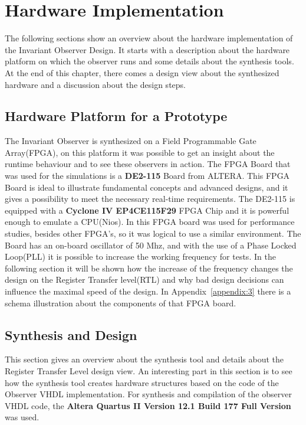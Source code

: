 \chapter{Hardware Implementation}

\ifpdf
    \graphicspath{{Chapter3/Figs/Raster/}{Chapter3/Figs/PDF/}{Chapter3/Figs/}}
\else
    \graphicspath{{Chapter3/Figs/Vector/}{Chapter3/Figs/}}
\fi


The following sections show an overview about the hardware implementation of the Invariant Observer Design. 
It starts with a description about the hardware platform on which the observer runs and some details
about the synthesis tools. 
At the end of this chapter, there comes a design view about the synthesized hardware and a discussion about 
the design steps. 
\section{Hardware Platform for a Prototype}
The Invariant Observer is synthesized on a Field Programmable Gate Array(FPGA), on this platform it was possible to get an insight
about the runtime behaviour and to see these observers in action. 
The FPGA Board that was used for the simulations is a \textbf{DE2-115} Board from ALTERA\cite{altera1}. 
This FPGA Board is ideal to illustrate fundamental concepts and advanced designs, and it gives a possibility
to meet the necessary real-time requirements. The DE2-115 is equipped with a \textbf{Cyclone IV EP4CE115F29} 
FPGA Chip and it is powerful enough to emulate a CPU(Nios). In \cite{RTFMBJ13} this FPGA board was used for performance studies, besides other FPGA's,
so it was logical to use a similar environment. 
The Board has an on-board oscillator of 50 Mhz, and with the use of a Phase Locked Loop(PLL) it is possible to increase the working frequency for tests. 
In the following section it will be shown how the increase of the frequency changes the design on the Register Transfer level(RTL) and why bad design decisions 
can influence the maximal speed of the design. In Appendix~\ref{appendix:3} there is a schema illustration about the components of that FPGA board. 


\section{Synthesis and Design}
This section gives an overview about the synthesis tool and details about the Register Transfer Level design view. 
An interesting part in this section is to see how the synthesis tool creates hardware structures based on the code of the
Observer VHDL implementation. \newline
For synthesis and compilation of the observer VHDL code, the \textbf{Altera Quartus II Version 12.1 Build 177 Full Version} was used. 
